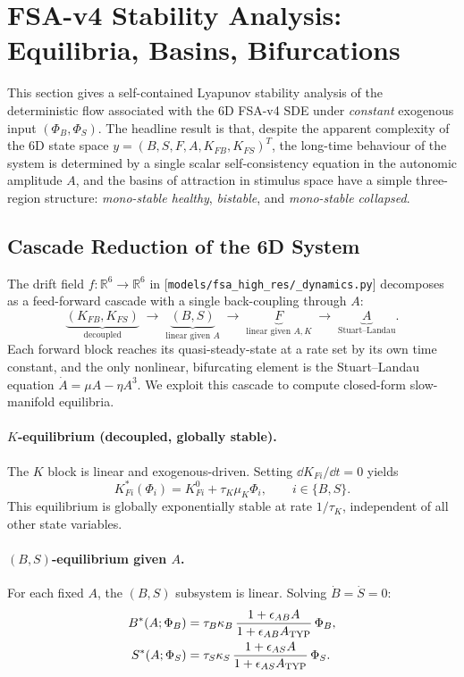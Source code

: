 \section{FSA-v4 Stability Analysis: Equilibria, Basins, Bifurcations} \label{sec:fsa-v4-stability}

This section gives a self-contained Lyapunov stability analysis of the deterministic flow associated with the 6D FSA-v4 SDE under \emph{constant} exogenous input $(\Phi_B, \Phi_S)$. The headline result is that, despite the apparent complexity of the 6D state space $y = (B, S, F, A, K_{FB}, K_{FS})^T$, the long-time behaviour of the system is determined by a single scalar self-consistency equation in the autonomic amplitude $A$, and the basins of attraction in stimulus space have a simple three-region structure: \emph{mono-stable healthy}, \emph{bistable}, and \emph{mono-stable collapsed}.

\subsection{Cascade Reduction of the 6D System} \label{sec:v4-cascade}

The drift field $f: \mathbb{R}^6 \to \mathbb{R}^6$ in [\texttt{models/fsa\_high\_res/\_dynamics.py}] decomposes as a feed-forward cascade with a single back-coupling through $A$:
\[
\underbrace{(K_{FB}, K_{FS})}_{\text{decoupled}} \;\longrightarrow\; \underbrace{(B, S)}_{\text{linear given }A} \;\longrightarrow\; \underbrace{F}_{\text{linear given }A,K} \;\longrightarrow\; \underbrace{A}_{\text{Stuart--Landau}}.
\]
Each forward block reaches its quasi-steady-state at a rate set by its own time constant, and the only nonlinear, bifurcating element is the Stuart--Landau equation $\dot A = \mu A - \eta A^3$. We exploit this cascade to compute closed-form slow-manifold equilibria.

\paragraph{$K$-equilibrium (decoupled, globally stable).}
The $K$ block is linear and exogenous-driven. Setting $\dd K_{Fi}/\dd t = 0$ yields
\begin{equation}
K_{Fi}^*(\Phi_i) = K_{Fi}^0 + \tau_K \mu_K \Phi_i, \qquad i \in \{B, S\}.
\label{eq:K-star}
\end{equation}
This equilibrium is globally exponentially stable at rate $1/\tau_K$, independent of all other state variables.

\paragraph{$(B, S)$-equilibrium given $A$.}
For each fixed $A$, the $(B, S)$ subsystem is linear. Solving $\dot B = \dot S = 0$:
\begin{align}
B^*(A; \Phi_B) &= \tau_B \kappa_B \, \frac{1 + \epsilon_{AB} A}{1 + \epsilon_{AB} A_{\rm TYP}} \, \Phi_B, \label{eq:B-star} \\
S^*(A; \Phi_S) &= \tau_S \kappa_S \, \frac{1 + \epsilon_{AS} A}{1 + \epsilon_{AS} A_{\rm TYP}} \, \Phi_S. \label{eq:S-star}
\end{align}

